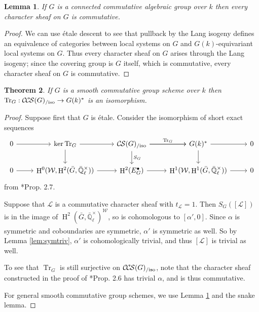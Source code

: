 \documentclass[10pt]{amsart}
\theoremstyle{plain}
\newtheorem{theorem}{Theorem}[section]
\newtheorem{lemma}[theorem]{Lemma}
\theoremstyle{definition}
\newcommand{\EE}{\mathbb{\bar Q}_\ell}
\newcommand{\Fq}{k}
\newcommand{\EEx}{\EE^\times}
\newcommand{\Weil}[1]{\mathcal{W}_{#1}}
\DeclareMathOperator{\Hh}{H}
\newcommand{\trFrob}[1]{t_{#1}}
\newcommand{\TrFrob}[1]{\operatorname{Tr}_{#1}}
\newcommand{\cs}[1]{{\mathcal{#1}}}
\newcommand{\CS}{{\mathcal{C\hskip-0.8pt S}}}
\newcommand{\CCS}{{\mathcal{C\hskip-.8pt C\hskip-0.8pt S}}}
\newcommand{\CSiso}[1]{\CS(#1)_{/\text{iso}}}
\newcommand{\CCSiso}[1]{\CCS(#1)_{/\text{iso}}}
\newcommand{\bG}{\bar{G}}
\begin{document}
\begin{lemma} \label{lem:conncomm}
If $G$ is a connected commutative algebraic group over $\Fq$ then every character sheaf on $G$ is commutative.
\end{lemma}

\begin{proof}
We can use \'etale descent to see that pullback by the Lang isogeny defines an equivalence
of categories between local systems on $G$ and $G(\Fq)$-equivariant local systems on $G$.  Thus every character
sheaf on $G$ arises through the Lang isogeny; since the covering group is $G$ itself, which is commutative,
every character sheaf on $G$ is commutative.
\end{proof}

\begin{theorem} \label{thm:trfrobiso}
If $G$ is a smooth commutative group scheme over $\Fq$ then $\TrFrob{G} : \CCSiso{G} \to G(\Fq)^*$ is an isomorphism.
\end{theorem}

\begin{proof}
Suppose first that $G$ is \'etale.  Consider the isomorphism of short exact sequences
\[
\begin{tikzcd}
 0 \arrow{r} & \ker \TrFrob{G} \arrow{d} \arrow{r} & \CSiso{G}\arrow{d}{S_G} \arrow{r}{\TrFrob{G}} \arrow{r} & G(\Fq)^* \arrow{d} \arrow{r} & 0\\
  0 \arrow{r} & \Hh^0(\Weil{},\Hh^2(\bG,\EEx)) \arrow{r} & \Hh^2(E^\bullet_G) \arrow{r} & \Hh^1(\Weil{},\Hh^1(\bG,\EEx)) \arrow{r} & 0
 \end{tikzcd}
 \]
from \cite{cunningham-roe:13a}*{Prop. 2.7}.

Suppose that $\cs{L}$ is a commutative character sheaf
with $\trFrob{\cs{L}} = 1$.  Then $S_G([\cs{L}])$ is in the image of $\Hh^2(\bG, \EEx)^\Weil{}$, so is cohomologous to
$[\alpha', 0]$.  Since $\alpha$ is symmetric and coboundaries are symmetric, $\alpha'$ is symmetric as well.
So by Lemma \ref{lem:symtriv}, $\alpha'$ is cohomologically trivial, and thus $[\cs{L}]$ is trivial as well.

To see that $\TrFrob{G}$ is still surjective on $\CCSiso{G}$, note that the character sheaf constructed in the proof of
\cite{cunningham-roe:13a}*{Prop. 2.6} has trivial $\alpha$, and is thus commutative.

For general smooth commutative group schemes, we use Lemma \ref{lem:conncomm} and the snake lemma.
\end{proof}
\end{document}
